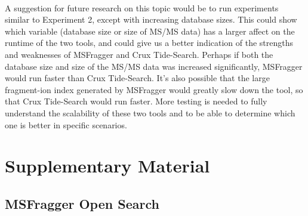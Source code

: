 \documentclass [11pt] {article}
\begin{document}
	\paragraph {}
	A suggestion for future research on this topic would be to run experiments similar to Experiment 2, except with increasing database sizes.  This could show which variable (database size or size of MS/MS data) has a larger affect on the runtime of the two tools, and could give us a better indication of the strengths and weaknesses of MSFragger and Crux Tide-Search.  Perhaps if both the database size and size of the MS/MS data was increased significantly, MSFragger would run faster than Crux Tide-Search.  It's also possible that the large fragment-ion index generated by MSFragger would greatly slow down the tool, so that Crux Tide-Search would run faster.  More testing is needed to fully understand the scalability of these two tools and to be able to determine which one is better in specific scenarios.
	
	
	\section {Supplementary Material}
	
	\subsection {MSFragger Open Search}
	
\end{document}
